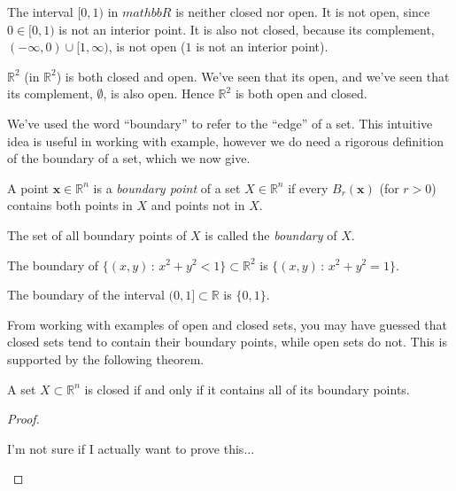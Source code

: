 \documentclass{ximera}
\begin{document}
\begin{example}
\begin{foldable}
The interval $[0,1)$ in $mathbb{R}$ is neither closed nor open. It is not open, since $0\in [0,1)$ is not an interior point. It is also not closed, because its complement, $(-\infty, 0)\cup [1,\infty)$, is not open ($1$ is not an interior point).

$\mathbb{R}^2$ (in $\mathbb{R}^2$) is both closed and open. We've seen that its open, and we've seen that its complement, $\emptyset$, is also open. Hence $\mathbb{R}^2$ is both open and closed.
\end{foldable}
\end{example} 

We've used the word ``boundary'' to refer to the ``edge'' of a set. This intuitive idea is useful in working with example, however we do need a rigorous definition of the boundary of a set, which we now give.

\begin{definition}
A point $\mathbf{x}\in\mathbb{R}^n$ is a \emph{boundary point} of a set $X\in \mathbb{R}^n$ if every $B_r(\mathbf{x})$ (for $r>0$) contains both points in $X$ and points not in $X$.

The set of all boundary points of $X$ is called the \emph{boundary} of $X$.
\end{definition}

\begin{example}
\begin{foldable}
The boundary of $\{(x,y)\,:\,x^2+y^2<1\}\subset\mathbb{R}^2$ is $\{(x,y)\,:\,x^2+y^2=1\}$. %

The boundary of the interval $(0,1]\subset\mathbb{R}$ is $\{0,1\}$.
\end{foldable}
\end{example}

From working with examples of open and closed sets, you may have guessed that closed sets tend to contain their boundary points, while open sets do not. This is supported by the following theorem.

\begin{theorem}
A set $X\subset\mathbb{R}^n$ is closed if and only if it contains all of its boundary points.
\end{theorem}

\begin{proof}
\begin{unfoldable}
I'm not sure if I actually want to prove this...
\end{unfoldable}
\end{proof}
\end{document}

